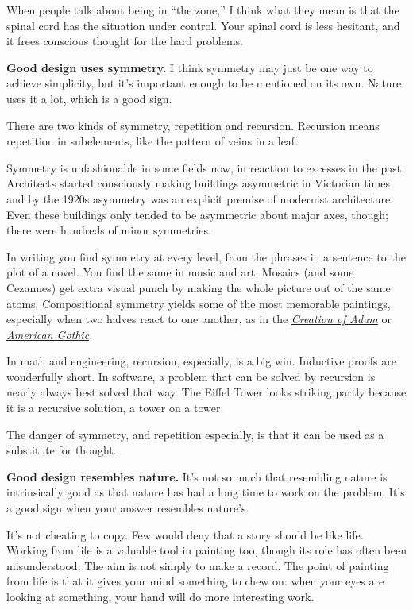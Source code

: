 \documentclass[12pt]{book}
\begin{document}
When people talk about being in ``the zone,'' I think what they mean is
that the spinal cord has the situation under control. Your spinal cord
is less hesitant, and it frees conscious thought for the hard problems.

\textbf{Good design uses symmetry.} I think symmetry may just be one way
to achieve simplicity, but it's important enough to be mentioned on its
own. Nature uses it a lot, which is a good sign.

There are two kinds of symmetry, repetition and recursion. Recursion
means repetition in subelements, like the pattern of veins in a leaf.

Symmetry is unfashionable in some fields now, in reaction to excesses in
the past. Architects started consciously making buildings asymmetric in
Victorian times and by the 1920s asymmetry was an explicit premise of
modernist architecture. Even these buildings only tended to be
asymmetric about major axes, though; there were hundreds of minor
symmetries.

In writing you find symmetry at every level, from the phrases in a
sentence to the plot of a novel. You find the same in music and art.
Mosaics (and some Cezannes) get extra visual punch by making the whole
picture out of the same atoms. Compositional symmetry yields some of the
most memorable paintings, especially when two halves react to one
another, as in the \emph{\href{symptg.html}{Creation of Adam}} or
\emph{\href{symptg.html}{American Gothic}.}

In math and engineering, recursion, especially, is a big win. Inductive
proofs are wonderfully short. In software, a problem that can be solved
by recursion is nearly always best solved that way. The Eiffel Tower
looks striking partly because it is a recursive solution, a tower on a
tower.

The danger of symmetry, and repetition especially, is that it can be
used as a substitute for thought.

\textbf{Good design resembles nature.} It's not so much that resembling
nature is intrinsically good as that nature has had a long time to work
on the problem. It's a good sign when your answer resembles nature's.

It's not cheating to copy. Few would deny that a story should be like
life. Working from life is a valuable tool in painting too, though its
role has often been misunderstood. The aim is not simply to make a
record. The point of painting from life is that it gives your mind
something to chew on: when your eyes are looking at something, your hand
will do more interesting work.
\end{document}
